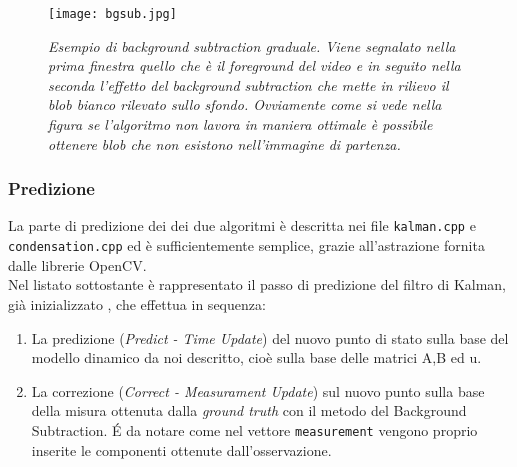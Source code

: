 \begin{figure}[hbp]
\centering
	\texttt{[image: bgsub.jpg]}
\caption[Esempio di background subtraction graduale]{\textit{Esempio di background subtraction graduale. Viene segnalato nella prima finestra quello che è il foreground del video e in seguito nella seconda l'effetto del background subtraction che mette in rilievo il blob bianco rilevato sullo sfondo. Ovviamente come si vede nella figura se l'algoritmo non lavora in maniera ottimale è possibile ottenere blob che non esistono nell'immagine di partenza.}\label{fig:bgsub}}
\end{figure}
\newpage

\subsubsection{Predizione}
La parte di predizione dei dei due algoritmi è descritta nei file \texttt{kalman.cpp} e \texttt{condensation.cpp} ed è sufficientemente semplice, grazie all'astrazione fornita dalle librerie OpenCV.\\
Nel listato sottostante è rappresentato il passo di predizione del filtro di Kalman, già inizializzato , che effettua in sequenza:
\begin{enumerate}
 \item La predizione (\textit{Predict - Time Update}) del nuovo punto di stato sulla base del modello dinamico da noi descritto, cioè sulla base delle matrici A,B ed u.
\item La correzione (\textit{Correct - Measurament Update}) sul nuovo punto sulla base della misura ottenuta dalla \textit{ground truth} con il metodo del Background Subtraction. \'E da notare come nel vettore \texttt{measurement} vengono proprio inserite le componenti ottenute dall'osservazione.
\end{enumerate}

